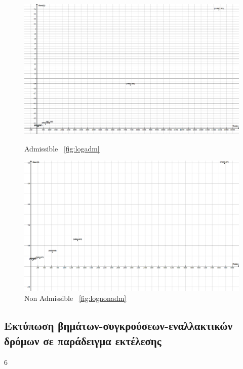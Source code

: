 \documentclass[a4paper,9pt]{article}
\begin{document}
\begin{figure}[H]
	\centering
\begin{minipage}{0.4\textwidth}
	\centering
	\includegraphics[width=0.3\textheight]{files/logAdm.png}
	\caption{Admissible ~\ref{fig:logadm}}
	\end{minipage}
\begin{minipage}{0.4\textwidth}
	\centering
	\includegraphics[width=0.3\textheight]{files/logNonAdm.png}
	\caption{Non Admissible ~\ref{fig:lognonadm}}
	\end{minipage}
\end{figure}


\subsection{Εκτύπωση βημάτων-συγκρούσεων-εναλλακτικών δρόμων σε παράδειγμα
εκτέλεσης}
6
\end{document}
